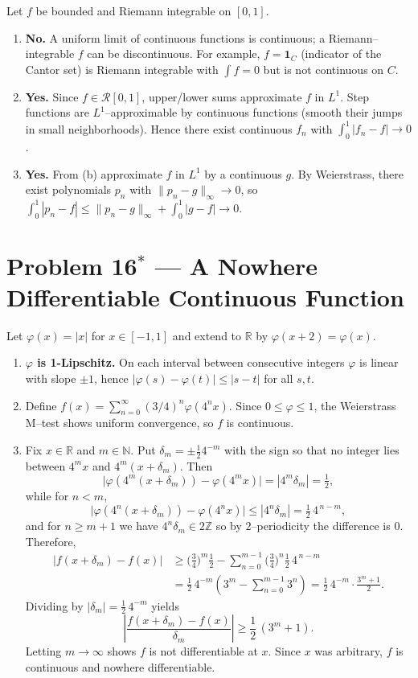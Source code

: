 \documentclass[12pt,a4paper]{article}
\theoremstyle{plain}
\theoremstyle{definition}
\theoremstyle{remark}
\theoremstyle{remark}
\begin{document}
Let $f$ be bounded and Riemann integrable on $[0,1]$.
\begin{enumerate}[label=(\alph*)]
	\item \textbf{No.} A uniform limit of continuous functions is continuous; a Riemann–integrable $f$ can be discontinuous.
	For example, $f=\mathbf 1_C$ (indicator of the Cantor set) is Riemann integrable with $\int f=0$ but is not continuous on $C$.
	\item \textbf{Yes.} Since $f\in\mathcal R[0,1]$, upper/lower sums approximate $f$ in $L^1$. Step functions are $L^1$–approximable by continuous functions (smooth their jumps in small neighborhoods). Hence there exist continuous $f_n$ with $\int_0^1|f_n-f|\to0$.
	\item \textbf{Yes.} From (b) approximate $f$ in $L^1$ by a continuous $g$. By Weierstrass, there exist polynomials $p_n$ with $\|p_n-g\|_\infty\to0$, so $\int_0^1|p_n-f|\le\|p_n-g\|_\infty+\int_0^1|g-f|\to0$.
\end{enumerate}

\bigskip
\section*{Problem 16$^\ast$ — A Nowhere Differentiable Continuous Function}

Let $\varphi(x)=|x|$ for $x\in[-1,1]$ and extend to $\mathbb R$ by $\varphi(x+2)=\varphi(x)$.
\begin{enumerate}[label=(\roman*)]
	\item \textbf{$\varphi$ is 1-Lipschitz.} On each interval between consecutive integers $\varphi$ is linear with slope $\pm1$, hence
	$|\varphi(s)-\varphi(t)|\le|s-t|$ for all $s,t$.
	\item Define $f(x)=\sum_{n=0}^\infty (3/4)^n\varphi(4^n x)$. Since $0\le\varphi\le1$, the Weierstrass M–test shows uniform convergence, so $f$ is continuous.
	\item Fix $x\in\mathbb R$ and $m\in\mathbb N$. Put $\delta_m=\pm \tfrac12 4^{-m}$ with the sign so that no integer lies between $4^m x$ and $4^m(x+\delta_m)$. Then
	\[
	\big|\varphi(4^m(x+\delta_m))-\varphi(4^m x)\big|=|4^m\delta_m|=\tfrac12,
	\]
	while for $n<m$,
	\[
	\big|\varphi(4^n(x+\delta_m))-\varphi(4^n x)\big|\le |4^n\delta_m|=\tfrac12\,4^{\,n-m},
	\]
	and for $n\ge m+1$ we have $4^n\delta_m\in 2\mathbb Z$ so by $2$–periodicity the difference is $0$.
	Therefore,
	\[
	\begin{aligned}
		\big|f(x+\delta_m)-f(x)\big|
		&\ge \Big(\frac{3}{4}\Big)^m\frac12
		- \sum_{n=0}^{m-1}\Big(\frac{3}{4}\Big)^n \frac12\,4^{\,n-m} \\
		&= \frac{1}{2}\,4^{-m}\!\left(3^m-\sum_{n=0}^{m-1}3^n\right)
		= \frac{1}{2}\,4^{-m}\cdot\frac{3^m+1}{2}.
	\end{aligned}
	\]
	Dividing by $|\delta_m|=\tfrac12\,4^{-m}$ yields
	\[
	\left|\frac{f(x+\delta_m)-f(x)}{\delta_m}\right|\ge \frac12\,(3^m+1).
	\]
	Letting $m\to\infty$ shows $f$ is not differentiable at $x$. Since $x$ was arbitrary, $f$ is continuous and nowhere differentiable.
\end{enumerate}
\end{document}
